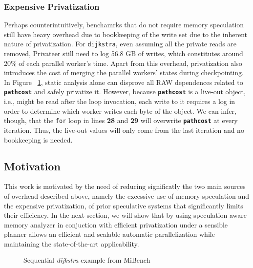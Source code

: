 \subsubsection{Expensive Privatization}
Perhaps counterintuitively, benchamrks that do not require memory
speculation still have heavy overhead due to bookkeeping of the write set
due to the inherent nature of privatization. For \texttt{dijkstra}, even
assuming all the private reads are removed, Privateer still need to log
56.8 GB of writes, which constitutes around 20\% of each parallel worker's
time. Apart from this overhead, privatization also introduces the cost of
merging the parallel workers' states during checkpointing. In Figure
~\ref{fig:dijkstra_motivation}, static analysis alone can disprove all RAW
dependences related to \texttt{\textbf{pathcost}} and safely privatize it.
However, because \texttt{\textbf{pathcost}} is a live-out object, i.e.,
might be read after the loop invocation, each write to it requires a log in
order to determine which worker writes each byte of the object. We can
infer, though, that the \texttt{for} loop in lines \textbf{28} and
\textbf{29} will overwrite \texttt{\textbf{pathcost}} at every iteration.
Thus, the live-out values will only come from the last iteration and no
bookkeeping is needed.

\subsection{Motivation}
This work is motivated by the need of reducing significatly the two main
sources of overhead described above, namely the excessive use of memory
speculation and the expensive privatization, of prior speculative systems
that significantly limits their efficiency.
%
In the next section, we will show that by using speculation-aware memory
analyzer in conjuction with efficient privatization under a sensible
planner allows an efficient and scalable automatic parallelization while
maintaining the state-of-the-art applicability.


\lstset{basicstyle=\ttfamily, numbers=left, numberstyle=\tiny,
  stepnumber=1, numbersep=5pt}
\begin{figure}[t]
  \centering
  \scriptsize
    \subfloat{
    \begin{minipage}{5cm}
      
    \end{minipage}
    }
\caption{Sequential \textit{dijkstra} example from MiBench~\cite{guthaus:2001:iiwsc}}
\label{fig:dijkstra_motivation}
\end{figure}
